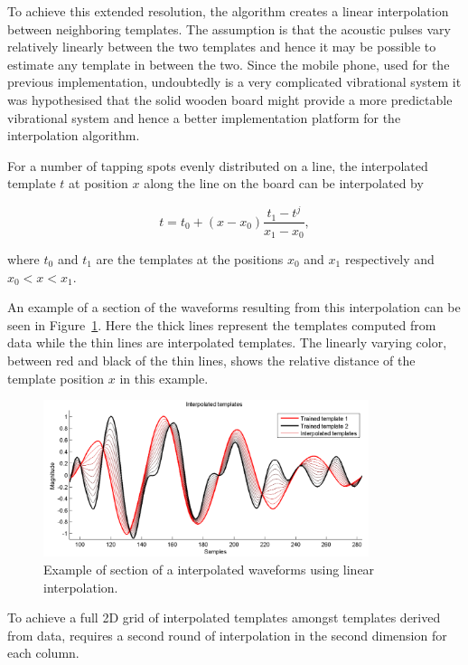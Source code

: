 To achieve this extended resolution, the algorithm creates a linear interpolation between neighboring templates. The assumption is that the acoustic pulses vary relatively linearly between the two templates and hence it may be possible to estimate any template in between the two. Since the mobile phone, used for the previous implementation, undoubtedly is a very complicated vibrational system it was hypothesised that the solid wooden board might provide a more predictable vibrational system and hence a better implementation platform for the interpolation algorithm.

For a number of tapping spots evenly distributed on a line, the interpolated template $t$ at position $x$ along the line on the board can be interpolated by

\begin{equation}\label{eq:interp}
t = t_0 + \left(x - x_0\right) \frac{t_{1} - t^j}{x_1 - x_0},
\end{equation}

where $t_0$ and $t_1$ are the templates at the positions $x_0$ and $x_1$ respectively and \linebreak[0]$x_0 < x < x_1$.

An example of \DIFdelbegin {}\DIFdelend a section of the waveforms resulting from this interpolation can be seen in Figure~\ref{fig:InterpData}. Here the thick lines represent the templates computed from data while the thin lines are interpolated templates. The linearly varying color, between red and black of the thin lines, shows the relative distance of the template position $x$ in this example.

\begin{figure}[!]
\centering
\includegraphics[width=360px]{InterpData.pdf}
\caption{Example of section of a interpolated waveforms using linear interpolation.}\label{fig:InterpData}
\end{figure}

To achieve a full 2D grid of interpolated templates amongst templates derived from data, requires a second round of interpolation in the second dimension for each column.


